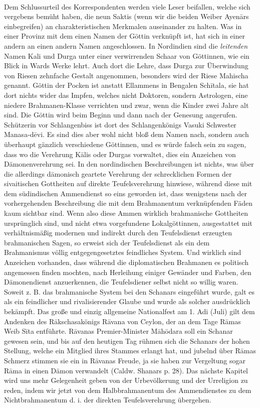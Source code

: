 \documentclass{article}
\begin{document}
\paragraph{}
Dem Schlussurteil des Korrespondenten werden viele Leser beifallen, welche sich vergebens bemüht haben, die neun Saktis (wenn wir die beiden Weiber Ayen\={a}rs einbegreifen) an charakteristischen Merkmalen auseinander zu halten. Was in einer Provinz mit dem einen Namen der Göttin verknüpft ist, hat sich in einer andern an einen andern Namen angeschlossen. In Nordindien sind die \emph{leitenden} Namen Kali und Durga unter einer verwirrenden Schaar von Göttinnen, wie ein Blick in Wards Werke lehrt. Auch dort die Lehre, dass Durga zur Überwindung von Riesen zehnfache Gestalt angenommen, besonders wird der Riese Mahischa genannt. Göttin der Pocken ist anstatt Ellammens in Bengalen Sch\={i}tala, sie hat dort nichts wider das Impfen, welches nicht Doktoren, sondern Astrologen, eine niedere Brahmanen-Klasse verrichten und zwar, wenn die Kinder zwei Jahre alt sind. Die Göttin wird beim Beginn und dann nach der Genesung angerufen. Schützerin vor Schlangenbiss ist dort des Schlangenkönigs Vasuki Schwester Manasa-d\={e}vi. Es sind dies aber wohl nicht bloß dem Namen nach, sondern auch überhaupt gänzlich verschiedene Göttinnen, und es würde falsch sein zu sagen, dass wo die Verehrung K\={a}lis oder Durgas vorwaltet, dies ein Anzeichen von Dämonenverehrung sei. In den nordindischen Beschreibungen ist nichts, was über die allerdings dämonisch geartete Verehrung der schrecklichen Formen der sivaitischen Gottheiten auf direkte Teufelsverehrung hinwiese, während diese mit dem südindischen Ammendienst so eins geworden ist, dass wenigstens nach der vorhergehenden Beschreibung die mit dem Brahmanentum verknüpfenden Fäden kaum sichtbar sind. Wenn also diese Ammen wirklich brahmanische Gottheiten ursprünglich sind, und nicht etwa vorgefundene Lokalgöttinnen, ausgestattet mit verhältnismäßig modernen und indirekt durch den Teufelsdienst erzeugten brahmanischen Sagen, so erweist sich der Teufelsdienst als ein dem Brahmanismus völlig entgegengesetztes feindliches System. Und wirklich sind Anzeichen vorhanden, dass während die diplomatischen Brahmanen es politisch angemessen finden mochten, nach Herleihung einiger Gewänder und Farben, den Dämonendienst anzuerkennen, die Teufelsdiener selbst nicht so willig waren. Soweit z. B. das brahmanische System bei den Schanars eingeführt wurde, galt es als ein feindlicher und rivalisierender Glaube und wurde als solcher ausdrücklich bekämpft. Das große und einzig allgemeine Nationalfest am 1. Adi (Juli) gilt dem Andenken des R\={a}kschasakönigs R\={a}vana von Ceylon, der an dem Tage R\={a}mas Weib S\={i}ta entführte. R\={a}vanas Premier-Minister M\={a}h\={o}dara soll ein Schanar gewesen sein, und bis auf den heutigen Tag rühmen sich die Schanars der hohen Stellung, welche ein Mitglied ihres Stammes erlangt hat, und jubelnd über R\={a}mas Schmerz stimmen sie ein in R\={a}vanas Freude, ja sie haben zur Vergeltung sogar R\={a}ma in einen Dämon verwandelt (Caldw. Shanars p. 28). Das nächste Kapitel wird uns mehr Gelegenheit geben von der Urbevölkerung und der Urreligion zu reden, indem wir jetzt von dem Halbbrahmanentum des Ammendienstes zu dem Nichtbrahmanentum d. i. der direkten Teufelsverehrung übergehen.
\end{document}
